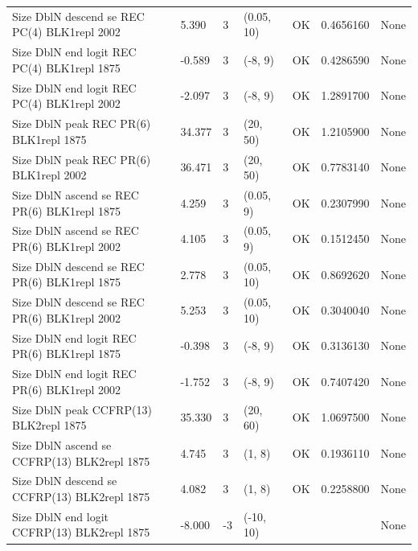 \documentclass[11pt,
  english,
]{article}
\begin{document}
\begin{landscape}
\begin{longtable}[t]{lllllll}
Size DblN descend se REC PC(4) BLK1repl 2002 & 5.390 & 3 & (0.05, 10) & OK & 0.4656160 & None\\
Size DblN end logit REC PC(4) BLK1repl 1875 & -0.589 & 3 & (-8, 9) & OK & 0.4286590 & None\\
Size DblN end logit REC PC(4) BLK1repl 2002 & -2.097 & 3 & (-8, 9) & OK & 1.2891700 & None\\
\addlinespace
Size DblN peak REC PR(6) BLK1repl 1875 & 34.377 & 3 & (20, 50) & OK & 1.2105900 & None\\
Size DblN peak REC PR(6) BLK1repl 2002 & 36.471 & 3 & (20, 50) & OK & 0.7783140 & None\\
Size DblN ascend se REC PR(6) BLK1repl 1875 & 4.259 & 3 & (0.05, 9) & OK & 0.2307990 & None\\
Size DblN ascend se REC PR(6) BLK1repl 2002 & 4.105 & 3 & (0.05, 9) & OK & 0.1512450 & None\\
Size DblN descend se REC PR(6) BLK1repl 1875 & 2.778 & 3 & (0.05, 10) & OK & 0.8692620 & None\\
\addlinespace
Size DblN descend se REC PR(6) BLK1repl 2002 & 5.253 & 3 & (0.05, 10) & OK & 0.3040040 & None\\
Size DblN end logit REC PR(6) BLK1repl 1875 & -0.398 & 3 & (-8, 9) & OK & 0.3136130 & None\\
Size DblN end logit REC PR(6) BLK1repl 2002 & -1.752 & 3 & (-8, 9) & OK & 0.7407420 & None\\
Size DblN peak CCFRP(13) BLK2repl 1875 & 35.330 & 3 & (20, 60) & OK & 1.0697500 & None\\
Size DblN ascend se CCFRP(13) BLK2repl 1875 & 4.745 & 3 & (1, 8) & OK & 0.1936110 & None\\
\addlinespace
Size DblN descend se CCFRP(13) BLK2repl 1875 & 4.082 & 3 & (1, 8) & OK & 0.2258800 & None\\
Size DblN end logit CCFRP(13) BLK2repl 1875 & -8.000 & -3 & (-10, 10) &  &  & None\\*
\end{longtable}
\leavevmode\tagmcend\tagstructend\par
\endgroup{}
\end{landscape}
\end{document}
